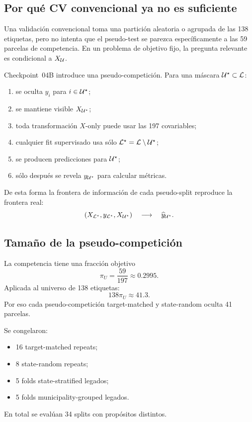 \subsection{Por qué CV convencional ya no es suficiente}

Una validación convencional toma una partición aleatoria o agrupada de las 138 etiquetas, pero
no intenta que el pseudo-test se parezca específicamente a las 59 parcelas de competencia.
En un problema de objetivo fijo, la pregunta relevante es condicional a $X_{\mathcal{U}}$.

Checkpoint~04B introduce una pseudo-competición. Para una máscara
$\mathcal{U}^\star\subset\mathcal{L}$:
\begin{enumerate}
\item se oculta $y_i$ para $i\in\mathcal{U}^\star$;
\item se mantiene visible $X_{\mathcal{U}^\star}$;
\item toda transformación $X$-only puede usar las 197 covariables;
\item cualquier fit supervisado usa sólo
$\mathcal{L}^\star=\mathcal{L}\setminus\mathcal{U}^\star$;
\item se producen predicciones para $\mathcal{U}^\star$;
\item sólo después se revela $y_{\mathcal{U}^\star}$ para calcular métricas.
\end{enumerate}

De esta forma la frontera de información de cada pseudo-split reproduce la frontera real:
\[
(X_{\mathcal{L}^\star},y_{\mathcal{L}^\star},X_{\mathcal{U}^\star})
\quad\longrightarrow\quad
\widehat y_{\mathcal{U}^\star}.
\]

\subsection{Tamaño de la pseudo-competición}

La competencia tiene una fracción objetivo
\[
\pi_U=\frac{59}{197}\approx0.2995.
\]
Aplicada al universo de 138 etiquetas:
\[
138\pi_U\approx41.3.
\]
Por eso cada pseudo-competición target-matched y state-random oculta 41 parcelas.

Se congelaron:
\begin{itemize}
\item 16 target-matched repeats;
\item 8 state-random repeats;
\item 5 folds state-stratified legados;
\item 5 folds municipality-grouped legados.
\end{itemize}
En total se evalúan 34 splits con propósitos distintos.

